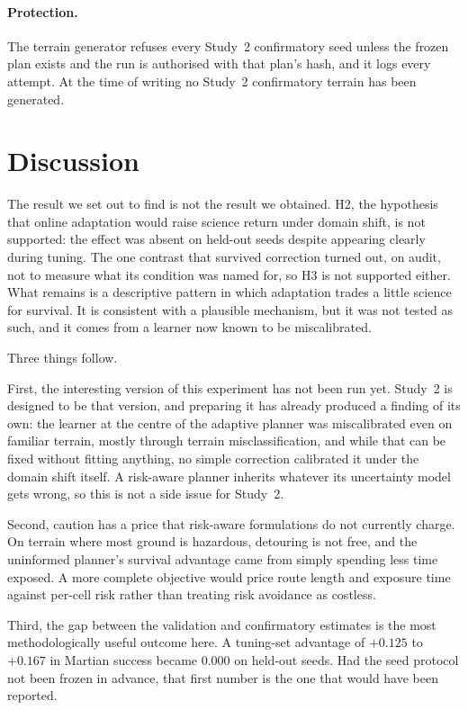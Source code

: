\documentclass[11pt]{article}
\begin{document}
\paragraph{Protection.} The terrain generator refuses every Study~2
confirmatory seed unless the frozen plan exists and the run is authorised with
that plan's hash, and it logs every attempt. At the time of writing no Study~2
confirmatory terrain has been generated.

\section{Discussion}

The result we set out to find is not the result we obtained. H2, the
hypothesis that online adaptation would raise science return under domain
shift, is not supported: the effect was absent on held-out seeds despite
appearing clearly during tuning. The one contrast that survived correction
turned out, on audit, not to measure what its condition was named for, so H3 is
not supported either. What remains is a descriptive pattern in which adaptation
trades a little science for survival. It is consistent with a plausible
mechanism, but it was not tested as such, and it comes from a learner now known
to be miscalibrated.

Three things follow.

First, the interesting version of this experiment has not been run yet.
Study~2 is designed to be that version, and preparing it has already produced a
finding of its own: the learner at the centre of the adaptive planner was
miscalibrated even on familiar terrain, mostly through terrain
misclassification, and while that can be fixed without fitting anything, no
simple correction calibrated it under the domain shift itself. A risk-aware
planner inherits whatever its uncertainty model gets wrong, so this is not a
side issue for Study~2.

Second, caution has a price that risk-aware formulations do not currently
charge. On terrain where most ground is hazardous, detouring is not free, and
the uninformed planner's survival advantage came from simply spending less
time exposed. A more complete objective would price route length and exposure
time against per-cell risk rather than treating risk avoidance as costless.

Third, the gap between the validation and confirmatory estimates is the most
methodologically useful outcome here. A tuning-set advantage of $+0.125$ to
$+0.167$ in Martian success became $0.000$ on held-out seeds. Had the seed
protocol not been frozen in advance, that first number is the one that would
have been reported.
\end{document}
